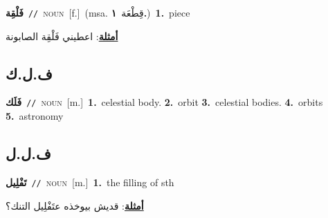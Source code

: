 \documentclass[10pt,a4paper,twoside]{article} %
\begin{document}
\begin{multicols}{2}
{\setlength\topsep{0pt}\textbf{\foreignlanguage{arabic}{فَلْقِة}}\ {\color{gray}\texttt{//}\color{black}}\ \textsc{noun}\ [f.]\ \color{gray}(msa. \foreignlanguage{arabic}{قِطْعَة}~\foreignlanguage{arabic}{\textbf{١.}})\color{black}\ \textbf{1.}~piece\  \begin{flushright}\color{gray}\foreignlanguage{arabic}{\textbf{\underline{\foreignlanguage{arabic}{أمثلة}}}: اعطيني فَلْقِة الصابونة}\end{flushright}\color{black}} \vspace{2mm}

\vspace{-3mm}
\subsection*{\color{blue}\foreignlanguage{arabic}{ف.ل.ك}\color{blue}{}} 

{\setlength\topsep{0pt}\textbf{\foreignlanguage{arabic}{فَلَك}}\ {\color{gray}\texttt{//}\color{black}}\ \textsc{noun}\ [m.]\ \textbf{1.}~celestial body.  \textbf{2.}~orbit  \textbf{3.}~celestial bodies.  \textbf{4.}~orbits  \textbf{5.}~astronomy\ } \vspace{2mm}

\vspace{-3mm}
\subsection*{\color{blue}\foreignlanguage{arabic}{ف.ل.ل}\color{blue}{}} 

{\setlength\topsep{0pt}\textbf{\foreignlanguage{arabic}{تَفْلِيل}}\ {\color{gray}\texttt{//}\color{black}}\ \textsc{noun}\ [m.]\ \textbf{1.}~the filling of sth\  \begin{flushright}\color{gray}\foreignlanguage{arabic}{\textbf{\underline{\foreignlanguage{arabic}{أمثلة}}}: قديش بيوخذه عتَفْلِيل التنك؟}\end{flushright}\color{black}} \vspace{2mm}


\end{multicols}
\end{document}
